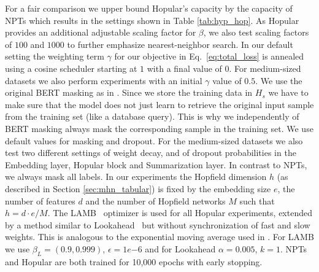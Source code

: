 \documentclass{article}
\theoremstyle{plain}
\theoremstyle{definition}
\theoremstyle{remark}
\begin{document}
For a fair comparison we upper bound Hopular's capacity by the capacity of NPTs which results
in the settings shown in Table \ref{tab:hyp_hop}.
As Hopular provides an additional adjustable scaling factor for $\beta$, we also test scaling factors of $100$ and $1000$ to further emphasize nearest-neighbor search.
In our default setting the weighting term $\gamma$ for our objective in Eq.~\eqref{eq:total_loss}
is annealed using a cosine scheduler starting at $1$ with a final value of $0$.
For medium-sized datasets we also perform experiments with an initial $\gamma$ value of $0.5$. 
We use the original BERT masking as in \citep{Devlin:19}.
Since we store the training data in $H_s$ we have to make sure that
the model does not just learn to retrieve the original input sample
from the training set (like a database query). This is why we 
independently of BERT masking always
mask the corresponding sample in the training set.
We use default values for masking and dropout.
For the medium-sized datasets we also test two different settings of weight decay, and of dropout probabilities in the
Embedding layer, Hopular block and Summarization layer.
In contrast to NPTs, we always mask all labels.
In our experiments the Hopfield dimension $h$ (as described in Section \ref{sec:mhn_tabular})
is fixed by the embedding size $e$, the number of features $d$ and
the number of Hopfield networks $M$ such that $h = d \cdot e / M$.
The LAMB~\citep{You:20} optimizer is used for all Hopular experiments, extended by a method similar to Lookahead~\citep{Zhang1:19} but without synchronization of
fast and slow weights. This is analogous to the exponential moving average used in
\citep{Grill:20}.
For LAMB we use $\beta_L = (0.9, 0.999)$, $\epsilon = 1e{-6}$ and for Lookahead $\alpha = 0.005$, $k = 1$.
NPTs and Hopular are both trained for 10,000 epochs with
early stopping.
\end{document}
